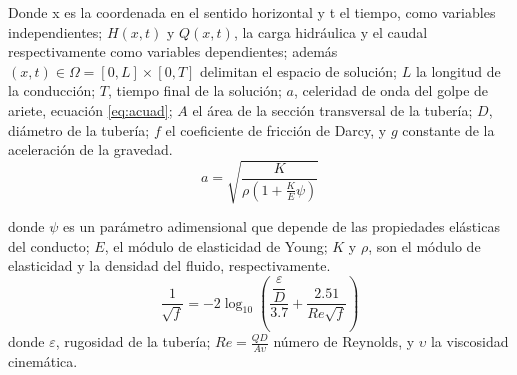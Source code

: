 \documentclass[letterpaper]{report}
\begin{document}
Donde x es la coordenada en el sentido horizontal y t el tiempo, como variables independientes; $H(x,t)$ y $Q(x,t)$, la carga hidráulica y el caudal respectivamente como variables dependientes; además $(x,t) \in \Omega=[0,L]\times[0,T]$ delimitan el espacio de solución; $L$ la longitud de la conducción; $T$, tiempo final de la solución; $a$, celeridad de onda del golpe de ariete, ecuación \ref{eq:acuad}; $A$ el área de la sección transversal de la tubería; $D$, diámetro de la tubería; $f$ el coeficiente de fricción de Darcy, y $g$ constante de la aceleración de la gravedad.
\begin{equation}
	a=\sqrt{\dfrac{K}{\rho\left(1+\frac{K}{E}\psi\right)}}
\label{eq:qp21}
\end{equation}

donde $\psi$ es un parámetro adimensional que depende de las propiedades elásticas del conducto; $E$, el módulo de elasticidad de Young; $K$ y $\rho$, son el módulo de elasticidad y la densidad del fluido, respectivamente.
\begin{equation*}
	\dfrac{1}{\sqrt f}=-2\log_{10}{\left(\dfrac{\dfrac{\varepsilon}{D}}{3.7}+\dfrac{2.51}{Re\sqrt f}\right)}
\end{equation*}
donde $\varepsilon$, rugosidad de la tubería; $Re=\frac{QD}{A\upsilon}$ número de Reynolds, y $\upsilon$ la viscosidad cinemática.
\end{document}
